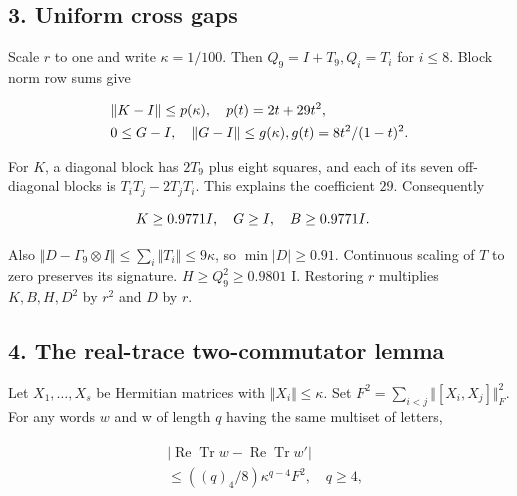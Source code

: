 \subsection{3. Uniform cross gaps}\label{b-uniform-cross-gaps}

Scale \(r\) to one and write \(\kappa  =1/100\). Then
\(Q_{9}=I+T_{9}, Q_{i}=T_{i}\) for \(i\le 8\). Block norm row sums give

\begin{gather*}
\begin{aligned}
& \Vert K-I\Vert  \le  p( \kappa  ), \quad  p(t)=2t+29t^{2}, \\
& 0\le G-I, \quad  \Vert G-I\Vert \le g( \kappa  ), g(t)=8t^{2}/(1-t)^{2}.
\end{aligned}\notag
\end{gather*}

For \(K\), a diagonal block has \(2T_{9}\) plus eight squares, and each
of its seven off-diagonal blocks is \(T_{i} T_{j}-2T_{j} T_{i}\). This
explains the coefficient \(29\). Consequently

\begin{gather*}
\begin{aligned}
& K\ge 0.9771 I, \quad  G\ge I, \quad  B\ge 0.9771 I.
\end{aligned}\notag
\end{gather*}

Also
\(\Vert D- \Gamma _{9} \otimes  I\Vert \le \sum _{i}\Vert T_{i}\Vert \le 9 \kappa\),
so \(\min \vert D\vert \ge 0.91\). Continuous scaling of \(T\) to zero
preserves its signature. \(H\ge Q_{9}^{2}\ge 0.9801\) I. Restoring \(r\)
multiplies \(K,B,H,D^{2}\) by \(r^{2}\) and \(D\) by \(r\).

\subsection{4. The real-trace two-commutator
lemma}\label{b-the-real-trace-two-commutator-lemma}

Let \(X_{1},\ldots ,X_{s}\) be Hermitian matrices with
\(\Vert X_{i}\Vert \le  \kappa\). Set
\(F^{2}=\sum _{i<j}\Vert [X_{i},X_{j}]\Vert _{F}^{2}\). For any words
\(w\) and w\textquotesingle{} of length \(q\) having the same multiset
of letters,

\begin{gather*}
\begin{aligned}
& \vert \operatorname{Re}  \operatorname{Tr}  w-\operatorname{Re}  \operatorname{Tr}  w'\vert \\
& \le  ((q)_{4}/8) \kappa ^{q-4} F^{2}, \quad  q\ge 4,
\end{aligned}\tag{2}
\end{gather*}

